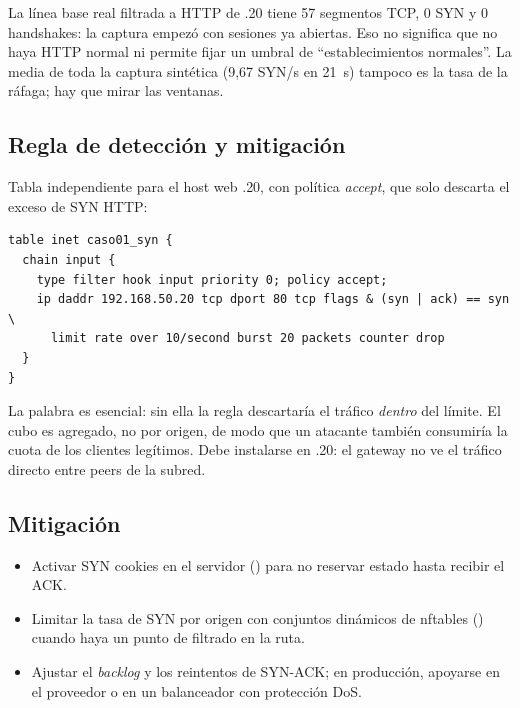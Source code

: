 
La línea base real filtrada a HTTP de .20 tiene 57 segmentos TCP, 0 SYN y 0 handshakes: la captura empezó con sesiones ya abiertas. Eso no significa que no haya HTTP normal ni permite fijar un umbral de ``establecimientos normales''. La media de toda la captura sintética (9,67 SYN/s en 21~s) tampoco es la tasa de la ráfaga; hay que mirar las ventanas.

\subsection{Regla de detección y mitigación}
Tabla independiente para el host web .20, con política \emph{accept}, que solo descarta el exceso de SYN HTTP:
\begin{lstlisting}
table inet caso01_syn {
  chain input {
    type filter hook input priority 0; policy accept;
    ip daddr 192.168.50.20 tcp dport 80 tcp flags & (syn | ack) == syn \
      limit rate over 10/second burst 20 packets counter drop
  }
}
\end{lstlisting}
La palabra  es esencial: sin ella la regla descartaría el tráfico \emph{dentro} del límite. El cubo es agregado, no por origen, de modo que un atacante también consumiría la cuota de los clientes legítimos. Debe instalarse en .20: el gateway no ve el tráfico directo entre peers de la subred.

\subsection{Mitigación}
\begin{itemize}
\item Activar SYN cookies en el servidor () para no reservar estado hasta recibir el ACK.
\item Limitar la tasa de SYN por origen con conjuntos dinámicos de nftables (\cod{meter}) cuando haya un punto de filtrado en la ruta.
\item Ajustar el \emph{backlog} y los reintentos de SYN-ACK; en producción, apoyarse en el proveedor o en un balanceador con protección DoS.
\end{itemize}

